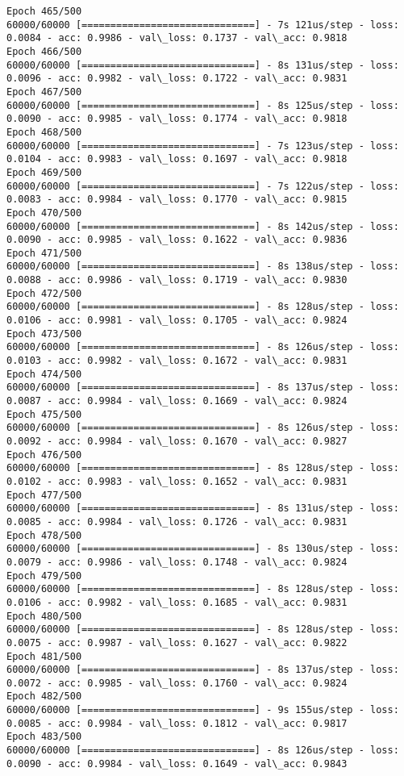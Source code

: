 \documentclass[11pt]{article}
\begin{document}
\begin{Verbatim}[commandchars=\\\{\}]
Epoch 465/500
60000/60000 [==============================] - 7s 121us/step - loss: 0.0084 - acc: 0.9986 - val\_loss: 0.1737 - val\_acc: 0.9818
Epoch 466/500
60000/60000 [==============================] - 8s 131us/step - loss: 0.0096 - acc: 0.9982 - val\_loss: 0.1722 - val\_acc: 0.9831
Epoch 467/500
60000/60000 [==============================] - 8s 125us/step - loss: 0.0090 - acc: 0.9985 - val\_loss: 0.1774 - val\_acc: 0.9818
Epoch 468/500
60000/60000 [==============================] - 7s 123us/step - loss: 0.0104 - acc: 0.9983 - val\_loss: 0.1697 - val\_acc: 0.9818
Epoch 469/500
60000/60000 [==============================] - 7s 122us/step - loss: 0.0083 - acc: 0.9984 - val\_loss: 0.1770 - val\_acc: 0.9815
Epoch 470/500
60000/60000 [==============================] - 8s 142us/step - loss: 0.0090 - acc: 0.9985 - val\_loss: 0.1622 - val\_acc: 0.9836
Epoch 471/500
60000/60000 [==============================] - 8s 138us/step - loss: 0.0088 - acc: 0.9986 - val\_loss: 0.1719 - val\_acc: 0.9830
Epoch 472/500
60000/60000 [==============================] - 8s 128us/step - loss: 0.0106 - acc: 0.9981 - val\_loss: 0.1705 - val\_acc: 0.9824
Epoch 473/500
60000/60000 [==============================] - 8s 126us/step - loss: 0.0103 - acc: 0.9982 - val\_loss: 0.1672 - val\_acc: 0.9831
Epoch 474/500
60000/60000 [==============================] - 8s 137us/step - loss: 0.0087 - acc: 0.9984 - val\_loss: 0.1669 - val\_acc: 0.9824
Epoch 475/500
60000/60000 [==============================] - 8s 126us/step - loss: 0.0092 - acc: 0.9984 - val\_loss: 0.1670 - val\_acc: 0.9827
Epoch 476/500
60000/60000 [==============================] - 8s 128us/step - loss: 0.0102 - acc: 0.9983 - val\_loss: 0.1652 - val\_acc: 0.9831
Epoch 477/500
60000/60000 [==============================] - 8s 131us/step - loss: 0.0085 - acc: 0.9984 - val\_loss: 0.1726 - val\_acc: 0.9831
Epoch 478/500
60000/60000 [==============================] - 8s 130us/step - loss: 0.0079 - acc: 0.9986 - val\_loss: 0.1748 - val\_acc: 0.9824
Epoch 479/500
60000/60000 [==============================] - 8s 128us/step - loss: 0.0106 - acc: 0.9982 - val\_loss: 0.1685 - val\_acc: 0.9831
Epoch 480/500
60000/60000 [==============================] - 8s 128us/step - loss: 0.0075 - acc: 0.9987 - val\_loss: 0.1627 - val\_acc: 0.9822
Epoch 481/500
60000/60000 [==============================] - 8s 137us/step - loss: 0.0072 - acc: 0.9985 - val\_loss: 0.1760 - val\_acc: 0.9824
Epoch 482/500
60000/60000 [==============================] - 9s 155us/step - loss: 0.0085 - acc: 0.9984 - val\_loss: 0.1812 - val\_acc: 0.9817
Epoch 483/500
60000/60000 [==============================] - 8s 126us/step - loss: 0.0090 - acc: 0.9984 - val\_loss: 0.1649 - val\_acc: 0.9843

\end{Verbatim}
\end{document}
